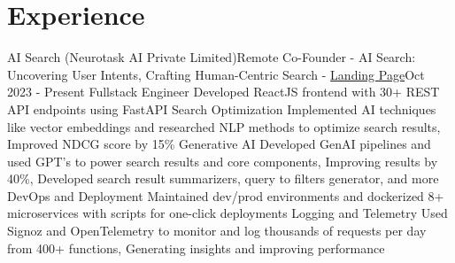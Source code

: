 \section{Experience}
\resumeSubHeadingListStart
\resumeSubheading
{AI Search (Neurotask AI Private Limited)}{Remote}
{Co-Founder - AI Search: Uncovering User Intents, Crafting Human-Centric Search - \href{https://intenthq.ai/}{Landing Page}}{Oct 2023 - Present}
\resumeItemListStart
\resumeItem
{Fullstack Engineer}
{Developed ReactJS frontend with 30+ REST API endpoints using FastAPI}
\resumeItem
{Search Optimization}
{Implemented AI techniques like vector embeddings and researched NLP methods to optimize search results, Improved NDCG score by 15\%}
\resumeItem
{Generative AI}
{Developed GenAI pipelines and used GPT's to power search results and core components, Improving results by 40\%, Developed search result summarizers, query to filters generator, and more}
\resumeItem
{DevOps and Deployment}
{Maintained dev/prod environments and dockerized 8+ microservices with scripts for one-click deployments}
\resumeItem
{Logging and Telemetry}
{Used Signoz and OpenTelemetry to monitor and log thousands of requests per day from 400+ functions, Generating insights and improving performance}
\resumeItemListEnd
\resumeSubHeadingListEnd

